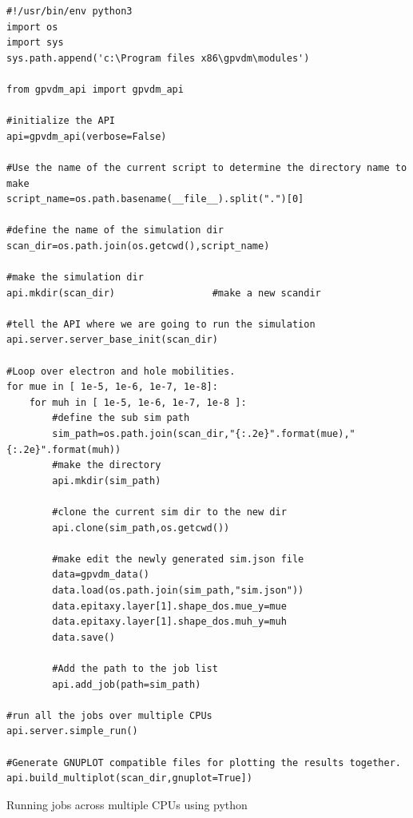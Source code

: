 \begin{listing}
\begin{verbatim}
#!/usr/bin/env python3
import os
import sys
sys.path.append('c:\Program files x86\gpvdm\modules')

from gpvdm_api import gpvdm_api

#initialize the API
api=gpvdm_api(verbose=False)

#Use the name of the current script to determine the directory name to make
script_name=os.path.basename(__file__).split(".")[0]

#define the name of the simulation dir
scan_dir=os.path.join(os.getcwd(),script_name)

#make the simulation dir
api.mkdir(scan_dir)					#make a new scandir

#tell the API where we are going to run the simulation
api.server.server_base_init(scan_dir)

#Loop over electron and hole mobilities.
for mue in [ 1e-5, 1e-6, 1e-7, 1e-8]:
	for muh in [ 1e-5, 1e-6, 1e-7, 1e-8 ]:
		#define the sub sim path
		sim_path=os.path.join(scan_dir,"{:.2e}".format(mue),"{:.2e}".format(muh))
		#make the directory
		api.mkdir(sim_path)

		#clone the current sim dir to the new dir
		api.clone(sim_path,os.getcwd())		

		#make edit the newly generated sim.json file
		data=gpvdm_data()
		data.load(os.path.join(sim_path,"sim.json"))
		data.epitaxy.layer[1].shape_dos.mue_y=mue
		data.epitaxy.layer[1].shape_dos.muh_y=muh
		data.save()

		#Add the path to the job list
		api.add_job(path=sim_path)

#run all the jobs over multiple CPUs
api.server.simple_run()

#Generate GNUPLOT compatible files for plotting the results together.
api.build_multiplot(scan_dir,gnuplot=True])

\end{verbatim}
\caption{Running jobs across multiple CPUs using python} 
\label{python-example6}
\end{listing}
